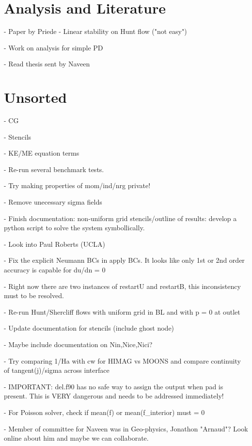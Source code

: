 \documentclass[3p,twocolumn,10pt]{elsarticle}
\begin{document}
\section{Analysis and Literature}
- Paper by Priede - Linear stability on Hunt flow ("not easy")

- Work on analysis for simple PD

- Read thesis sent by Naveen

\section{Unsorted}

- CG

- Stencils

- KE/ME equation terms

- Re-run several benchmark tests.

- Try making properties of mom/ind/nrg private!

- Remove unecessary sigma fields

- Finish documentation: non-uniform grid stencils/outline of results: develop a python script to solve the system symbollically.

- Look into Paul Roberts (UCLA)

- Fix the explicit Neumann BCs in apply BCs. It looks like only 1st or 2nd order accuracy is capable for du/dn = 0

- Right now there are two instances of restartU and restartB, this inconsistency must to be resolved.

- Re-run Hunt/Shercliff flows with uniform grid in BL and with p = 0 at outlet

- Update documentation for stencils (include ghost node)

- Maybe include documentation on Nin,Nice,Nici?

- Try comparing 1/Ha with cw for HIMAG vs MOONS and compare continuity of tangent(j)/sigma across interface

- IMPORTANT: del.f90 has no safe way to assign the output when pad is present. This is VERY dangerous and needs to be addressed immediately!

- For Poisson solver, check if mean(f) or mean(f\_interior) must = 0

- Member of committee for Naveen was in Geo-physics, Jonathon "Arnaud"? Look online about him and maybe we can collaborate.
\end{document}
